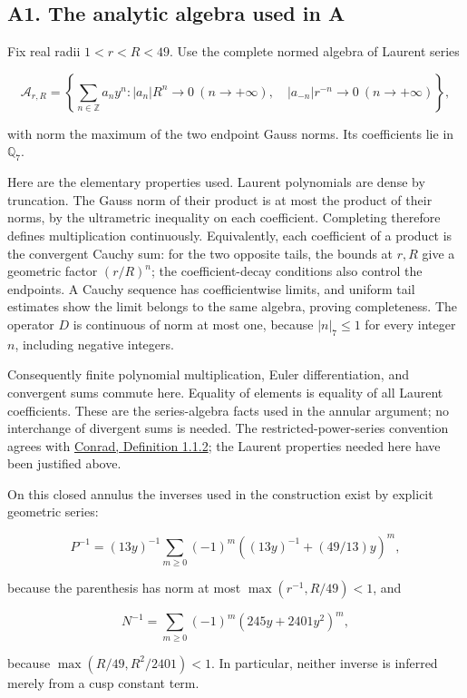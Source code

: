 \documentclass[11pt,a4paper]{article}
\begin{document}
\hypertarget{a1.-the-analytic-algebra-used-in-a}{%
\subsection{A1. The analytic algebra used in A}\label{a1.-the-analytic-algebra-used-in-a}}

Fix real radii \(1<r<R<49\). Use the complete normed algebra of Laurent series

\[
\mathscr A_{r,R}=
\left\{\sum_{n\in\mathbb Z}a_n y^n:
|a_n|R^n\to0\ (n\to+\infty),\quad
|a_{-n}|r^{-n}\to0\ (n\to+\infty)\right\},
\]

with norm the maximum of the two endpoint Gauss norms. Its coefficients lie in \(\mathbb{Q}_{7}\).

Here are the elementary properties used. Laurent polynomials are dense by truncation. The Gauss norm of their product is at most the product of their norms, by the ultrametric inequality on each coefficient. Completing therefore defines multiplication continuously. Equivalently, each coefficient of a product is the convergent Cauchy sum: for the two opposite tails, the bounds at \(r,R\) give a geometric factor \((r/R)^n\); the coefficient-decay conditions also control the endpoints. A Cauchy sequence has coefficientwise limits, and uniform tail estimates show the limit belongs to the same algebra, proving completeness. The operator \(D\) is continuous of norm at most one, because \(|n|_{7}≤1\) for every integer \(n\), including negative integers.

Consequently finite polynomial multiplication, Euler differentiation, and convergent sums commute here. Equality of elements is equality of all Laurent coefficients. These are the series-algebra facts used in the annular argument; no interchange of divergent sums is needed. The restricted-power-series convention agrees with \href{https://swc-math.github.io/aws/2007/ConradNotes11Mar.pdf}{Conrad, Definition 1.1.2}; the Laurent properties needed here have been justified above.

On this closed annulus the inverses used in the construction exist by explicit geometric series:

\[
P^{-1}=(13y)^{-1}
\sum_{m\ge0}(-1)^m\left((13y)^{-1}+(49/13)y\right)^m,
\]

because the parenthesis has norm at most \(\operatorname{max}(r^{-1},R/49)<1\), and

\[
N^{-1}=\sum_{m\ge0}(-1)^m(245y+2401y^2)^m,
\]

because \(\operatorname{max}(R/49,R^{2}/2401)<1\). In particular, neither inverse is inferred merely from a cusp constant term.
\end{document}
